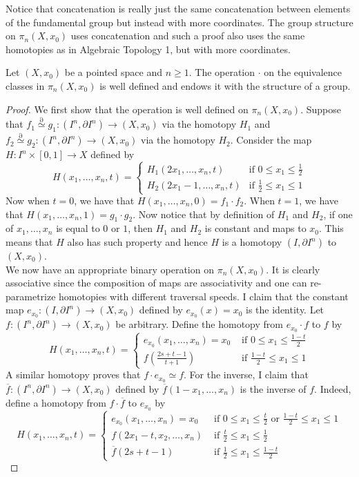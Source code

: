 \documentclass[a4paper]{article}
\begin{document}
Notice that concatenation is really just the same concatenation between elements of the fundamental group but instead with more coordinates. The group structure on $\pi_n(X,x_0)$ uses concatenation and such a proof also uses the same homotopies as in Algebraic Topology 1, but with more coordinates. 

\begin{thm}{}{} Let $(X,x_0)$ be a pointed space and $n\geq 1$. The operation $\cdot$ on the equivalence classes in $\pi_n(X,x_0)$ is well defined and endows it with the structure of a group. 
\begin{proof}
We first show that the operation is well defined on $\pi_n(X,x_0)$. Suppose that $f_1\overset{\partial}{\simeq} g_1:(I^n,\partial I^n)\to(X,x_0)$ via the homotopy $H_1$ and $f_2\overset{\partial}{\simeq} g_2:(I^n,\partial I^n)\to(X,x_0)$ via the homotopy $H_2$. Consider the map $H:I^n\times[0,1]\to X$ defined by $$H(x_1,\dots,x_n,t)=\begin{cases}
H_1(2x_1,\dots,x_n,t) & \text{if } 0\leq x_1\leq\frac{1}{2}\\
H_2(2x_1-1,\dots,x_n,t) & \text{if }\frac{1}{2}\leq x_1\leq 1
\end{cases}$$ 
Now when $t=0$, we have that $H(x_1,\dots,x_n,0)=f_1\cdot f_2$. When $t=1$, we have that $H(x_1,\dots,x_n,1)=g_1\cdot g_2$. Now notice that by definition of $H_1$ and $H_2$, if one of $x_1,\dots,x_n$ is equal to $0$ or $1$, then $H_1$ and $H_2$ is constant and maps to $x_0$. This means that $H$ also has such property and hence $H$ is a homotopy $(I,\partial I^n)$ to $(X,x_0)$. \\

We now have an appropriate binary operation on $\pi_n(X,x_0)$. It is clearly associative since the composition of maps are associativity and one can re-parametrize homotopies with different traversal speeds. I claim that the constant map $e_{x_0}:(I,\partial I^n)\to(X,x_0)$ defined by $e_{x_0}(x)=x_0$ is the identity. Let $f:(I^n,\partial I^n)\to(X,x_0)$ be arbitrary. Define the homotopy from $e_{x_0}\cdot f$ to $f$ by $$H(x_1,\dots,x_n,t)=\begin{cases}
e_{x_0}(x_1,\dots,x_n)=x_0 & \text{ if }0\leq x_1\leq\frac{1-t}{2}\\
f\left(\frac{2s+t-1}{t+1}\right) & \text{ if }\frac{1-t}{2}\leq x_1\leq 1
\end{cases}$$ A similar homotopy proves that $f\cdot e_{x_0}\simeq f$. For the inverse, I claim that $\overline{f}:(I^n,\partial I^n)\to(X,x_0)$ defined by $\overline{f}(1-x_1,\dots,x_n)$ is the inverse of $f$. Indeed, define a homotopy from $f\cdot\overline{f}$ to $e_{x_0}$ by $$H(x_1,\dots,x_n,t)=\begin{cases}
e_{x_0}(x_1,\dots,x_n)=x_0 & \text{ if }0\leq x_1\leq\frac{t}{2}\text{ or }\frac{1-t}{2}\leq x_1\leq 1\\
f(2x_1-t,x_2,\dots,x_n) & \text{ if }\frac{t}{2}\leq x_1\leq\frac{1}{2}\\
\overline{f}(2s+t-1) & \text{ if }\frac{1}{2}\leq x_1\leq\frac{1-t}{2}
\end{cases}$$
\end{proof}
\end{thm}
\end{document}
